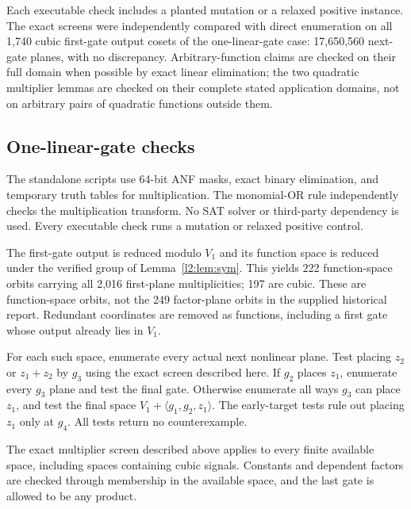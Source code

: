 \documentclass[11pt,a4paper]{article}
\theoremstyle{plain}
\theoremstyle{remark}
\begin{document}
Each executable check includes a planted mutation or a relaxed positive instance. The exact screens were independently compared with direct enumeration on all 1,740 cubic first-gate output cosets of the one-linear-gate case: 17,650,560 next-gate planes, with no discrepancy. Arbitrary-function claims are checked on their full domain when possible by exact linear elimination; the two quadratic multiplier lemmas are checked on their complete stated application domains, not on arbitrary pairs of quadratic functions outside them.

\subsection{One-linear-gate checks}

The standalone scripts use 64-bit ANF masks, exact binary elimination, and temporary truth tables for multiplication. The monomial-OR rule independently checks the multiplication transform. No SAT solver or third-party dependency is used. Every executable check runs a mutation or relaxed positive control.

The first-gate output is reduced modulo $V_1$ and its function space is reduced under the verified group of Lemma~\ref{l2:lem:sym}. This yields 222 function-space orbits carrying all 2,016 first-plane multiplicities; 197 are cubic. These are function-space orbits, not the 249 factor-plane orbits in the supplied historical report. Redundant coordinates are removed as functions, including a first gate whose output already lies in $V_1$.

For each such space, enumerate every actual next nonlinear plane. Test placing $z_2$ or $z_1+z_2$ by $g_3$ using the exact screen described here. If $g_2$ places $z_1$, enumerate every $g_3$ plane and test the final gate. Otherwise enumerate all ways $g_3$ can place $z_1$, and test the final space $V_1+\langle g_1,g_2,z_1\rangle$. The early-target tests rule out placing $z_1$ only at $g_4$. All tests return no counterexample.

The exact multiplier screen described above applies to every finite available space, including spaces containing cubic signals. Constants and dependent factors are checked through membership in the available space, and the last gate is allowed to be any product.
\end{document}
